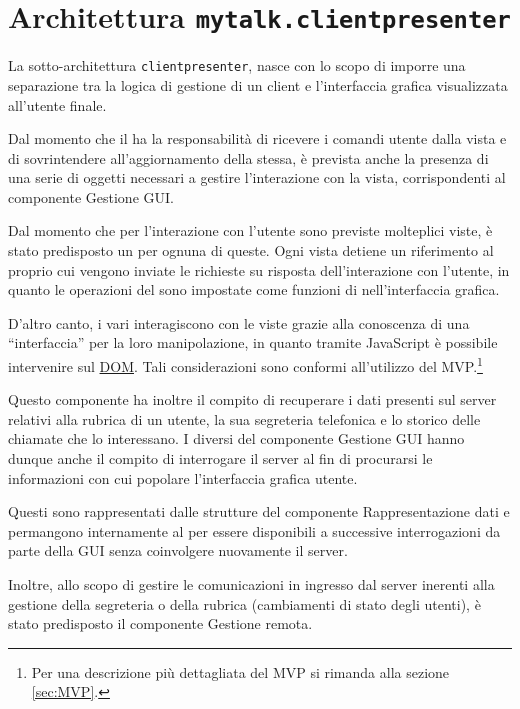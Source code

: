 \section{Architettura \texttt{mytalk.clientpresenter}}\label{sec:clientpresenter}
La sotto-architettura \texttt{clientpresenter}, nasce con lo scopo di imporre una separazione tra la logica di gestione di un client e l'interfaccia grafica visualizzata all'utente finale.

Dal momento che il  ha la responsabilità di ricevere i comandi utente dalla vista e di sovrintendere all'aggiornamento della stessa, è prevista anche la presenza di una serie di oggetti necessari a gestire l'interazione con la vista, corrispondenti al componente \textsf{Gestione GUI}\@.

Dal momento che per l'interazione con l'utente sono previste molteplici viste, è stato predisposto un  per ognuna di queste. Ogni vista detiene un riferimento al proprio  cui vengono inviate le richieste su risposta dell'interazione con l'utente, in quanto le operazioni del  sono impostate come funzioni di  nell'interfaccia grafica.

D'altro canto, i vari  interagiscono con le viste grazie alla conoscenza di una ``interfaccia'' per la loro manipolazione, in quanto tramite JavaScript è possibile intervenire sul \underline{DOM}\@. Tali considerazioni sono conformi all'utilizzo del  MVP.\footnote{%
  Per una descrizione più dettagliata del  MVP si rimanda alla sezione \ref{sec:MVP}\@.
}

Questo componente ha inoltre il compito di recuperare i dati presenti sul server relativi alla rubrica di un utente, la sua segreteria telefonica e lo storico delle chiamate che lo interessano. I diversi  del componente \textsf{Gestione GUI} hanno dunque anche il compito di interrogare il server al fin di procurarsi le informazioni con cui popolare l'interfaccia grafica utente.

Questi sono rappresentati dalle strutture del componente \textsf{Rappresentazione dati} e permangono internamente al  per essere disponibili a successive interrogazioni da parte della GUI senza coinvolgere nuovamente il server.

Inoltre, allo scopo di gestire le comunicazioni in ingresso dal server inerenti alla gestione della segreteria o della rubrica (cambiamenti di stato degli utenti), è stato predisposto il componente \textsf{Gestione remota}.

